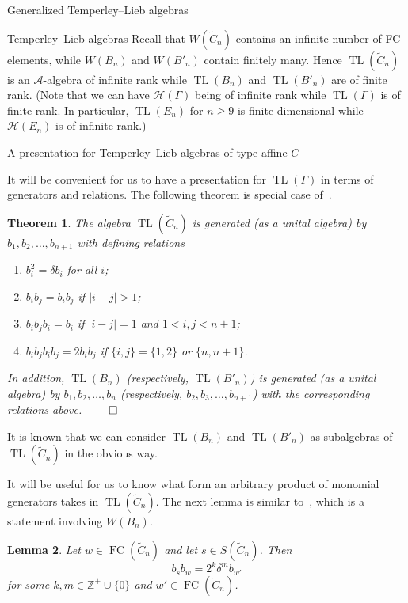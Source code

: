 \documentclass[11pt]{amsart}
\newtheorem{theorem}{Theorem}[subsection]
\newtheorem{lemma}[theorem]{Lemma}
\theoremstyle{definition}
\numberwithin{equation}{section}
\newcommand{\Z}{\mathbb{Z}}
\newcommand{\A}{\mathcal{A}}
\newcommand{\C}{\widetilde{C}}
\DeclareMathOperator{\TL}{TL}
\renewcommand{\(}{\left(}
\renewcommand{\)}{\right)}
\renewcommand{\H}{\mathcal{H}}
\DeclareMathOperator{\FC}{FC}
\begin{document}
\begin{section}{Generalized Temperley--Lieb algebras}
\begin{subsection}{Temperley--Lieb algebras}
Recall that $W(\C_{n})$ contains an infinite number of FC elements, while $W(B_{n})$ and $W(B'_{n})$ contain finitely many.  Hence $\TL(\C_{n})$ is an $\A$-algebra of infinite rank while $\TL(B_{n})$ and $\TL(B'_{n})$ are of finite rank.  (Note that we can have $\H(\Gamma)$ being of infinite rank while $\TL(\Gamma)$ is of finite rank.  In particular, $\TL(E_n)$ for $n\geq 9$ is finite dimensional while $\H(E_n)$ is of infinite rank.)

\end{subsection}


\begin{subsection}{A presentation for Temperley--Lieb algebras of type affine $C$}

It will be convenient for us to have a presentation for $\TL(\Gamma)$ in terms of generators and relations. The following theorem is special case of~\cite[Proposition 2.6]{Green2006a}.  

\begin{theorem}\label{thm:affine C relations}
The algebra $\TL(\C_{n})$ is generated (as a unital algebra) by $b_{1}, b_{2}, \dots, b_{n+1}$ with defining relations
\begin{enumerate}
\item $b_{i}^{2}=\delta b_{i}$ for all $i$;
\item $b_{i}b_{j}=b_{i}b_{j}$ if $|i-j|>1$;
\item $b_{i}b_{j}b_{i}=b_{i}$ if $|i-j|=1$ and $1< i,j < n+1$;
\item $b_{i}b_{j}b_{i}b_{j}=2b_{i}b_{j}$ if $\{i,j\}=\{1,2\}$ or $\{n,n+1\}$.
\end{enumerate}
In addition, $\TL(B_{n})$ (respectively, $\TL(B'_{n})$) is generated (as a unital algebra) by $b_{1}, b_{2}, \dots, b_{n}$ (respectively, $b_{2}, b_{3}, \dots, b_{n+1}$) with the corresponding relations above.  \hfill $\qed$
\end{theorem}

It is known that we can consider $\TL(B_{n})$ and $\TL(B'_{n})$ as subalgebras of $\TL(\C_{n})$ in the obvious way.

It will be useful for us to know what form an arbitrary product of monomial generators takes in $\TL(\C_{n})$.  The next lemma is similar to~\cite[Lemma 2.1.3]{Green2000}, which is a statement involving $W(B_{n})$.

\begin{lemma}\label{lem:powers of 2 and delta monomials}
Let $w \in \FC(\C_{n})$ and let $s \in S(\C_{n})$.  Then
\[
b_{s}b_{w}=2^{k}\delta^{m}b_{w'}
\]
for some $k, m \in \Z^{+}\cup \{0\}$ and $w' \in \FC(\C_{n})$.
\end{lemma}


\end{subsection}
\end{section}
\end{document}

